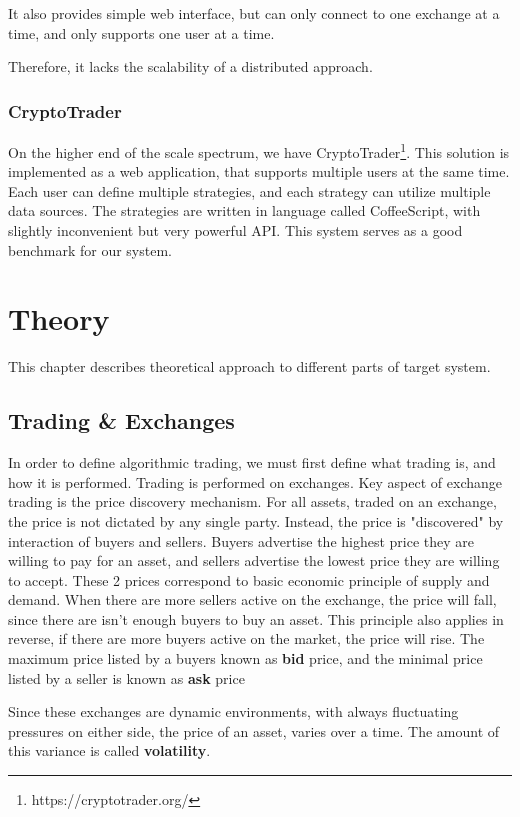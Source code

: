 It also provides simple web interface, but can only connect to one exchange at a time, and only supports one user at a time.

Therefore, it lacks the scalability of a distributed approach.

\subsection{CryptoTrader}
On the higher end of the scale spectrum, we have CryptoTrader\footnote{https://cryptotrader.org/}. This solution
is implemented as a web application, that supports multiple users at the same time. Each user can define multiple
strategies, and each strategy can utilize multiple data sources. The strategies are written in language called
CoffeeScript, with slightly inconvenient but very powerful API. This system serves as a good benchmark for
our system.


\chapter{Theory}
\label{chapter:theory}
This chapter describes theoretical approach to different parts of target system.
\section{Trading \& Exchanges}
In order to define algorithmic trading, we must first define what trading is, and how it is performed.
Trading is performed on exchanges. Key aspect of exchange trading is the price discovery mechanism. For all assets,
traded on an exchange, the price is not dictated by any single party. Instead, the price is "discovered" by interaction of
buyers and sellers. Buyers advertise the highest price they are willing to pay for an asset, and sellers advertise the lowest price
they are willing to accept. These 2 prices correspond to basic economic principle of supply and demand. When there are more sellers active
on the exchange, the price will fall, since there are isn't enough buyers to buy an asset. This principle also applies in reverse, if there are more
buyers active on the market, the price will rise.
The maximum price listed by a buyers known as \textbf{bid} price, and the minimal price listed by a seller is known as \textbf{ask} price

Since these exchanges are dynamic environments, with always fluctuating pressures on either side, the price of an asset, varies over a time.
The amount of this variance is called \textbf{volatility}.

